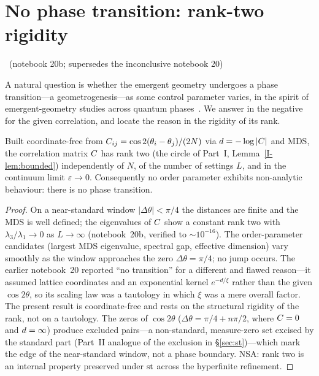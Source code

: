 \documentclass[11pt]{article}
\begin{document}
\section{No phase transition: rank-two rigidity}\label{sec:nophase}
\established\ (notebook 20b; supersedes the inconclusive notebook 20)

A natural question is whether the emergent geometry undergoes a phase transition---a
geometrogenesis---as some control parameter varies, in the spirit of emergent-geometry
studies across quantum phases~\cite{emergentdist2025,persistenthom}. We answer in the
negative for the given correlation, and locate the reason in the rigidity of its rank.

\begin{proposition}\label{prop:nophase}
Built coordinate-free from $C_{ij}=\cos2(\theta_i-\theta_j)/(2N)$ via
$d=-\log|C|$ and MDS, the correlation matrix $C$ has rank two (the circle of
Part~I, Lemma~\ref{I-lem:bounded}) independently of $N$, of the number of settings $L$,
and in the continuum limit $\varepsilon\to0$. Consequently no order parameter exhibits
non-analytic behaviour: there is no phase transition.
\end{proposition}

\begin{proof}
On a near-standard window $|\Delta\theta|<\pi/4$ the distances are finite and the MDS is
well defined; the eigenvalues of $C$ show a constant rank two with $\lambda_3/\lambda_1
\to0$ as $L\to\infty$ (notebook~20b, verified to $\sim10^{-16}$). The order-parameter
candidates (largest MDS eigenvalue, spectral gap, effective dimension) vary smoothly as the
window approaches the zero $\Delta\theta=\pi/4$; no jump occurs. The earlier notebook~20
reported ``no transition'' for a different and flawed reason---it assumed lattice
coordinates and an exponential kernel $e^{-d/\xi}$ rather than the given $\cos2\theta$, so
its scaling law was a tautology in which $\xi$ was a mere overall factor. The present
result is coordinate-free and rests on the structural rigidity of the rank, not on a
tautology. The zeros of $\cos2\theta$ ($\Delta\theta=\pi/4+n\pi/2$, where $C=0$ and
$d=\infty$) produce excluded pairs---a non-standard, measure-zero set excised by the
standard part (Part~II analogue of the exclusion in \S\ref{sec:st})---which mark the edge
of the near-standard window, not a phase boundary. NSA: rank two is an internal property
preserved under $\operatorname{st}$ across the hyperfinite refinement.
\end{proof}
\end{document}
